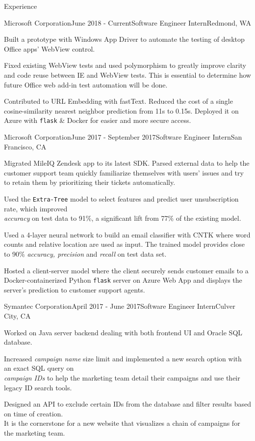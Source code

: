 \documentclass{resume} %
\begin{document}
\begin{rSection}{Experience}

\begin{rSubsection}{Microsoft Corporation}{June 2018 - Current}{Software Engineer Intern}{Redmond, WA}
\item Built a prototype with Windows App Driver to automate the testing of desktop Office apps' WebView control.
\item Fixed existing WebView tests and used polymorphism to greatly improve clarity and code reuse between IE and WebView tests. This is essential to determine how future Office web add-in test automation will be done.
\item Contributed to URL Embedding with fastText. Reduced the cost of a single cosine-similarity nearest neighbor prediction from 11s to 0.15s. Deployed it on Azure with \texttt{flask} \& Docker for easier and more secure access.
\end{rSubsection}

\begin{rSubsection}{Microsoft Corporation}{June 2017 - September 2017}{Software Engineer Intern}{San Francisco, CA}
\item Migrated MileIQ Zendesk app to its latest SDK. Parsed external data to help the customer support team quickly familiarize themselves with users' issues and try to retain them by prioritizing their tickets automatically.
\item Used the \texttt{Extra-Tree} model to select features and predict user unsubscription rate, which improved\\
\textit{accuracy} on test data to 91\%, a significant lift from 77\% of the existing model.
\item Used a 4-layer neural network to build an email classifier with CNTK where word counts and relative location are used as input. The trained model provides close to 90\% \textit{accuracy, precision} and \textit{recall} on test data set.
\item Hosted a client-server model where the client securely sends customer emails to a Docker-containerized Python \texttt{flask} server on Azure Web App and displays the server's prediction to customer support agents.
\end{rSubsection}

\begin{rSubsection}{Symantec Corporation}{April 2017 - June 2017}{Software Engineer Intern}{Culver City, CA}
\item Worked on Java server backend dealing with both frontend UI and Oracle SQL database.
\item Increased \textit{campaign name} size limit and implemented a new search option with an exact SQL query on\\ 
\textit{campaign IDs} to help the marketing team detail their campaigns and use their legacy ID search tools.
\item Designed an API to exclude certain IDs from the database and filter results based on time of creation.\\
It is the cornerstone for a new website that visualizes a chain of campaigns for the marketing team.
\end{rSubsection}


\end{rSection}
\end{document}
